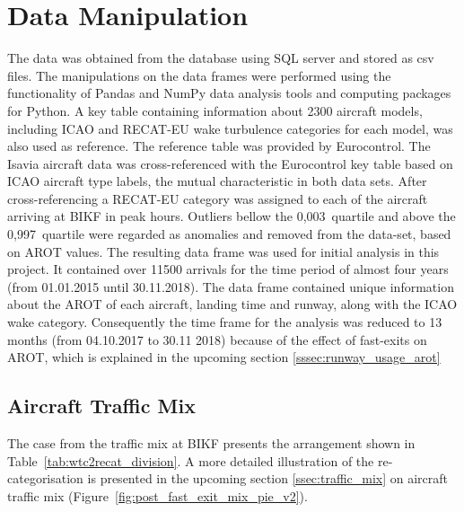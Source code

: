 \section{Data Manipulation}
The data was obtained from the database using SQL server and stored as csv files. The manipulations on the data frames were performed using the functionality of Pandas and NumPy data analysis tools and computing packages for Python. A key table containing information about 2300 aircraft models, including ICAO and RECAT-EU wake turbulence categories for each model, was also used as reference. 
The reference table was provided by Eurocontrol. 
The Isavia aircraft data was cross-referenced with the Eurocontrol key table based on ICAO aircraft type labels, the mutual characteristic in both data sets. 
After cross-referencing a RECAT-EU category was assigned to each of the aircraft arriving at BIKF in peak hours. Outliers bellow the 0,003~quartile and above the 0,997~quartile were regarded as anomalies and removed from the data-set, based on AROT values. 
The resulting data frame was used for initial analysis in this project. 
It contained over 11500 arrivals for the time period of almost four years (from 01.01.2015 until 30.11.2018). The data frame contained unique information about the AROT of each aircraft, landing time and runway, along with the ICAO wake category. Consequently the time frame for the analysis was reduced to 13 months (from 04.10.2017 to 30.11 2018) because of the effect of fast-exits on AROT, which is explained in the upcoming section \ref{sssec:runway_usage_arot}


\subsection{Aircraft Traffic Mix\label{ssec:traffic_mix}}

The case from the traffic mix at BIKF presents the arrangement shown in Table~\ref{tab:wtc2recat_division}. A more detailed illustration of the re-categorisation is presented in the upcoming section \ref{ssec:traffic_mix} on aircraft traffic mix (Figure~\ref{fig:post_fast_exit_mix_pie_v2}).

